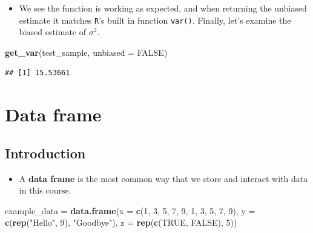 \documentclass[]{book}
\newenvironment{Shaded}{\begin{snugshade}}{\end{snugshade}}
\newcommand{\KeywordTok}[1]{\textcolor[rgb]{0.13,0.29,0.53}{\textbf{#1}}}
\newcommand{\DataTypeTok}[1]{\textcolor[rgb]{0.13,0.29,0.53}{#1}}
\newcommand{\DecValTok}[1]{\textcolor[rgb]{0.00,0.00,0.81}{#1}}
\newcommand{\StringTok}[1]{\textcolor[rgb]{0.31,0.60,0.02}{#1}}
\newcommand{\OtherTok}[1]{\textcolor[rgb]{0.56,0.35,0.01}{#1}}
\newcommand{\NormalTok}[1]{#1}
\providecommand{\tightlist}{%
  \setlength{\itemsep}{0pt}\setlength{\parskip}{0pt}}
\begin{document}
\begin{itemize}
\tightlist
\item
  We see the function is working as expected, and when returning the
  unbiased estimate it matches \texttt{R}'s built in function
  \texttt{var()}. Finally, let's examine the biased estimate of
  \(\sigma^2\).
\end{itemize}

\begin{Shaded}
\begin{Highlighting}[]
\KeywordTok{get_var}\NormalTok{(test_sample, }\DataTypeTok{unbiased =} \OtherTok{FALSE}\NormalTok{)}
\end{Highlighting}
\end{Shaded}

\begin{verbatim}
## [1] 15.53661
\end{verbatim}

\chapter{Data frame}\label{data-frame}

\section{Introduction}\label{introduction}

\begin{itemize}
\tightlist
\item
  A \textbf{data frame} is the most common way that we store and
  interact with data in this course.
\end{itemize}

\begin{Shaded}
\begin{Highlighting}[]
\NormalTok{example_data =}\StringTok{ }\KeywordTok{data.frame}\NormalTok{(}\DataTypeTok{x =} \KeywordTok{c}\NormalTok{(}\DecValTok{1}\NormalTok{, }\DecValTok{3}\NormalTok{, }\DecValTok{5}\NormalTok{, }\DecValTok{7}\NormalTok{, }\DecValTok{9}\NormalTok{, }\DecValTok{1}\NormalTok{, }\DecValTok{3}\NormalTok{, }\DecValTok{5}\NormalTok{, }\DecValTok{7}\NormalTok{, }\DecValTok{9}\NormalTok{),}
                          \DataTypeTok{y =} \KeywordTok{c}\NormalTok{(}\KeywordTok{rep}\NormalTok{(}\StringTok{"Hello"}\NormalTok{, }\DecValTok{9}\NormalTok{), }\StringTok{"Goodbye"}\NormalTok{),}
                          \DataTypeTok{z =} \KeywordTok{rep}\NormalTok{(}\KeywordTok{c}\NormalTok{(}\OtherTok{TRUE}\NormalTok{, }\OtherTok{FALSE}\NormalTok{), }\DecValTok{5}\NormalTok{))}
\end{Highlighting}
\end{Shaded}
\end{document}
